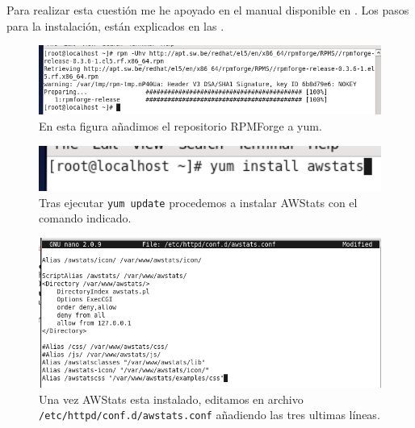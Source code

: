 Para realizar esta cuestión me he apoyado en el manual disponible en \cite{aws}. Los pasos para la instalación, están explicados en las .
\begin{figure}[H]
  \begin{center}
    \includegraphics[width=1\textwidth]{imagenes/aw1}
    \caption{En esta figura añadimos el repositorio RPMForge a yum.}
    \label{fig42}
  \end{center}
\end{figure}
\begin{figure}[H]
  \begin{center}
    \includegraphics[width=1\textwidth]{imagenes/aw2}
    \caption{Tras ejecutar \texttt{yum update} procedemos a instalar AWStats con el comando indicado.}
    \label{fig43}
  \end{center}
\end{figure}
\begin{figure}[H]
  \begin{center}
    \includegraphics[width=1\textwidth]{imagenes/aw3}
    \caption{Una vez AWStats esta instalado, editamos en archivo\newline\texttt{ /etc/httpd/conf.d/awstats.conf} añadiendo las tres ultimas líneas.}
    \label{fig44}
  \end{center}
\end{figure}
